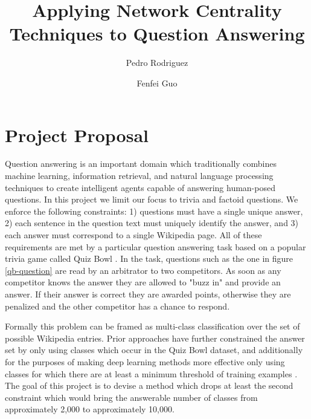 \documentclass[11pt]{article}
\title{Applying Network Centrality Techniques to Question Answering}
\author{
	Pedro Rodriguez\\
	\and
	Fenfei Guo
}
\begin{document}
\maketitle
\section{Project Proposal}

Question answering is an important domain which traditionally combines machine learning, information retrieval, and natural language processing techniques to create intelligent agents capable of answering human-posed questions. In this project we limit our focus to trivia and factoid questions. We enforce the following constraints: 1) questions must have a single unique answer, 2) each sentence in the question text must uniquely identify the answer, and 3) each answer must correspond to a single Wikipedia page. All of these requirements are met by a particular question answering task based on a popular trivia game called Quiz Bowl \cite{Boydgraber:2012wl}. In the task, questions such as the one in figure \ref{qb-question} are read by an arbitrator to two competitors. As soon as any competitor knows the answer they are allowed to "buzz in" and provide an answer. If their answer is correct they are awarded points, otherwise they are penalized and the other competitor has a chance to respond.

Formally this problem can be framed as multi-class classification over the set of possible Wikipedia entries. Prior approaches have further constrained the answer set by only using classes which occur in the Quiz Bowl dataset, and additionally for the purposes of making deep learning methods more effective only using classes for which there are at least a minimum threshold of training examples \cite{Iyyer:2014vq}. The goal of this project is to devise a method which drops at least the second constraint which would bring the answerable number of classes from approximately 2,000 to approximately 10,000.
\end{document}
